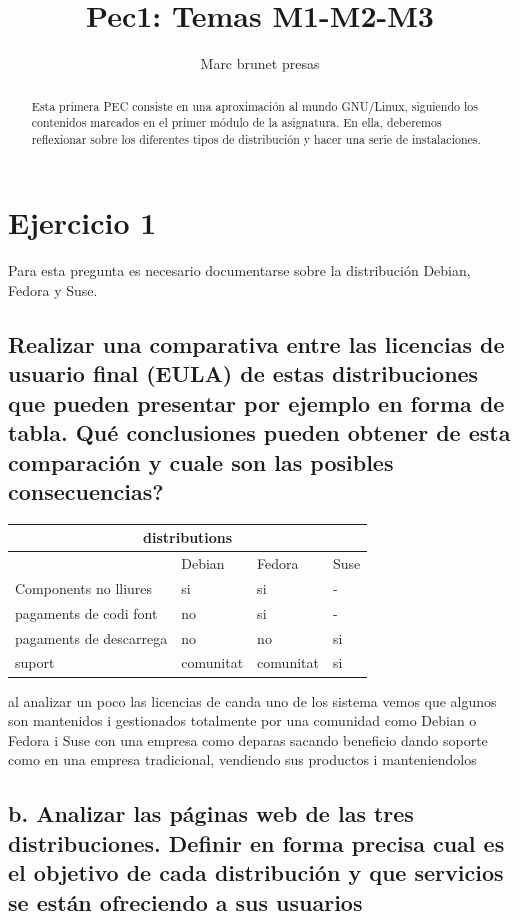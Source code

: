 \documentclass[preprint,11pt]{elsarticle}
\begin{document}
\begin{frontmatter}

    \title{Pec1: Temas M1-M2-M3}
    \author{Marc brunet presas}
    \address{Manresa, Barcelona,}
    \begin{abstract}
    Esta primera PEC consiste en una aproximación al mundo GNU/Linux, siguiendo los contenidos marcados en el primer módulo de la asignatura. En ella, deberemos reflexionar sobre los diferentes tipos de distribución y hacer una serie de instalaciones.
    \end{abstract}
\end{frontmatter}


\section{Ejercicio 1}
\label{S:1}
Para esta pregunta es necesario documentarse sobre la distribución Debian, Fedora y Suse.
\subsection{Realizar una comparativa entre las licencias de usuario final (EULA) de estas distribuciones que pueden presentar por ejemplo en forma de tabla. Qué conclusiones pueden obtener de esta comparación y cuale son las posibles consecuencias?}

\begin{tabular}{ |p{5cm}||p{2cm}|p{2cm}|p{2cm}|  }
 \hline
 \multicolumn{4}{|c|}{distributions} \\
 \hline
  &Debian &Fedora &Suse\\
 \hline
Components no lliures &si &si &-\\
pagaments de codi font &no &si &-\\
pagaments de descarrega &no &no &si\\
suport &comunitat &comunitat &si \\
 \hline
\end{tabular}
\bigskip 

al analizar un poco las licencias de canda uno de los sistema vemos que algunos son mantenidos i gestionados totalmente por una comunidad como Debian o Fedora i Suse con una empresa como deparas sacando beneficio dando soporte como en una empresa tradicional, vendiendo sus productos i manteniendolos 


\newpage
\subsection{b. Analizar las páginas web de las tres distribuciones. Definir en forma precisa cual es el objetivo de cada distribución y que servicios se están ofreciendo a sus usuarios}
\label{S:2}
\end{document}
